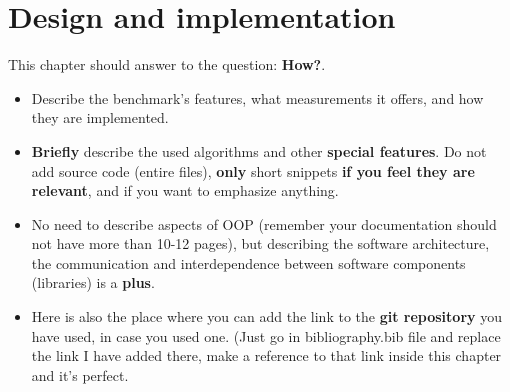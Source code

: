 \chapter{Design and implementation}

This chapter should answer to the question: \textbf{How?}. 

\begin{itemize}
  \item Describe the benchmark’s features, what measurements it offers, and how they are implemented.
  
  \item \textbf{Briefly} describe the used algorithms and other \textbf{special features}. Do not add source code (entire files), \textbf{only} short snippets \textbf{if you feel they are relevant}, and if you want to emphasize anything.
  
  \item No need to describe aspects of OOP (remember your documentation should not have more than 10-12 pages), but describing the software architecture, the communication and interdependence between software components (libraries) is a \textbf{plus}.
  
  \item Here is also the place where you can add the link to the \textbf{git repository} you have used, in case you used one. \cite{git-repo} (Just go in bibliography.bib file and replace the link I have added there, make a reference to that link inside this chapter and it's perfect.
\end{itemize}